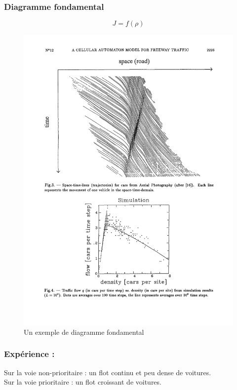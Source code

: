 \documentclass[slidetop,11pt]{beamer}
\begin{document}
\begin{frame}
	\frametitle{Diagramme fondamental}
	$$J = f(\rho)$$
	\begin{figure}
		\begin{center}	
			\includegraphics[scale = 0.6]{./images/dfondcomp}
		\end{center}
	\caption{Un exemple de diagramme fondamental}
	\end{figure}
\end{frame}
	
\begin{frame}
	\frametitle{Expérience :}
	Sur la voie non-prioritaire : un flot continu et peu dense de voitures.\\
	Sur la voie prioritaire : un flot croissant de voitures.
\end{frame}
	
\end{document}
